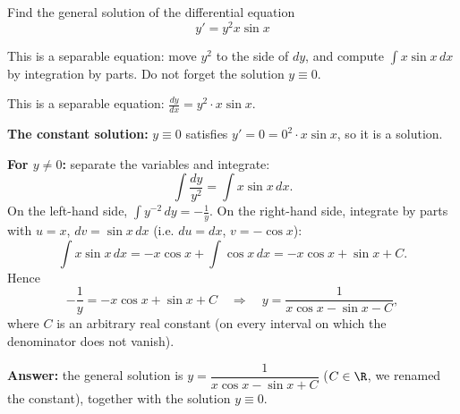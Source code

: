 
\begin{question}
Find the general solution of the differential equation
\[ y' = y^2 x \sin x \]
\end{question}

\begin{hint}
This is a separable equation: move $y^2$ to the side of $dy$, and compute $\int x\sin x\,dx$ by integration by parts. Do not forget the solution $y \equiv 0$.
\end{hint}

\begin{solution}
This is a separable equation: $\frac{dy}{dx} = y^2 \cdot x\sin x$.

\textbf{The constant solution:} $y \equiv 0$ satisfies $y' = 0 = 0^2 \cdot x\sin x$, so it is a solution.

\textbf{For $y \ne 0$:} separate the variables and integrate:
\[ \int \frac{dy}{y^2} = \int x\sin x\,dx. \]
On the left-hand side, $\int y^{-2}\,dy = -\frac{1}{y}$. On the right-hand side, integrate by parts with $u = x$, $dv = \sin x\,dx$ (i.e. $du = dx$, $v = -\cos x$):
\[ \int x\sin x\,dx = -x\cos x + \int \cos x\,dx = -x\cos x + \sin x + C. \]
Hence
\[ -\frac{1}{y} = -x\cos x + \sin x + C \quad\Longrightarrow\quad \boxed{y = \frac{1}{x\cos x - \sin x - C}}, \]
where $C$ is an arbitrary real constant (on every interval on which the denominator does not vanish).

\textbf{Answer:} the general solution is $y = \dfrac{1}{x\cos x - \sin x + C}$ ($C \in \R$, we renamed the constant), together with the solution $y \equiv 0$.
\end{solution}
